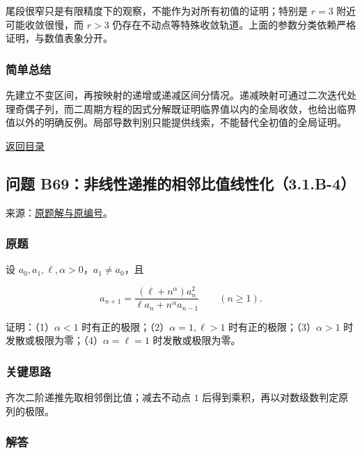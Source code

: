 \documentclass[11pt,a4paper]{article}
\begin{document}
尾段很窄只是有限精度下的观察，不能作为对所有初值的证明；特别是 \(r=3\)
附近可能收敛很慢，而 \(r>3\)
仍存在不动点等特殊收敛轨道。上面的参数分类依赖严格证明，与数值表象分开。

\subsubsection{简单总结}\label{ux7b80ux5355ux603bux7ed3-7}

先建立不变区间，再按映射的递增或递减区间分情况。递减映射可通过二次迭代处理奇偶子列，而二周期方程的因式分解既证明临界值以内的全局收敛，也给出临界值以外的明确反例。局部导数判别只能提供线索，不能替代全初值的全局证明。

\noindent\hyperref[contents]{返回目录}

\subsection{问题
B69：非线性递推的相邻比值线性化（3.1.B-4）}\label{ux95eeux9898-b69ux975eux7ebfux6027ux9012ux63a8ux7684ux76f8ux90bbux6bd4ux503cux7ebfux6027ux53163.1.b-4}

来源：\href{https://zj139.github.io/math-notes/problems/bba0529edd7210df6fd8f51a/\#问题-b69}{原题解与原编号}。

\subsubsection{原题}\label{ux539fux9898-8}

设 \(a_0,a_1,\ell,\alpha>0\)，\(a_1\ne a_0\)，且

\[
a_{n+1}=\frac{(\ell+n^\alpha)a_n^2}
{\ell a_n+n^\alpha a_{n-1}}\qquad(n\ge1).
\]

证明：（1）\(\alpha<1\) 时有正的极限；（2）\(\alpha=1,\ell>1\)
时有正的极限；（3）\(\alpha>1\) 时发散或极限为零；（4）\(\alpha=\ell=1\)
时发散或极限为零。

\subsubsection{关键思路}\label{ux5173ux952eux601dux8def-8}

齐次二阶递推先取相邻倒比值；减去不动点 \(1\)
后得到乘积，再以对数级数判定原列的极限。

\subsubsection{解答}\label{ux89e3ux7b54-8}
\end{document}
